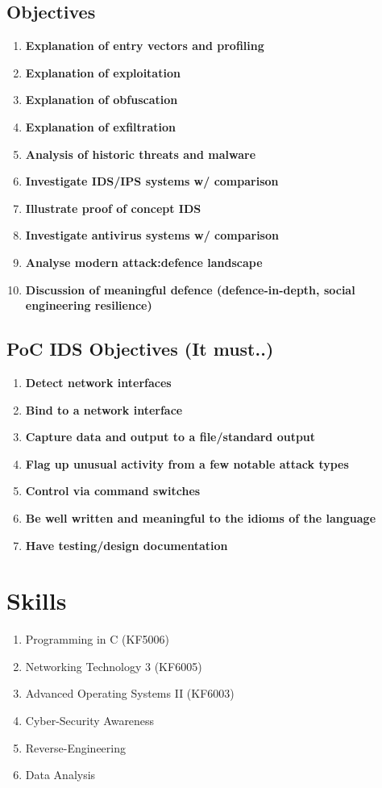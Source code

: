 \subsection{Objectives}
\begin{enumerate}
	\item \textbf{Explanation of entry vectors and profiling}
	\item \textbf{Explanation of exploitation}
	\item \textbf{Explanation of obfuscation}
	\item \textbf{Explanation of exfiltration}
	\item \textbf{Analysis of historic threats and malware}
	\item \textbf{Investigate IDS/IPS systems w/ comparison}
	\item \textbf{Illustrate proof of concept IDS}
	\item \textbf{Investigate antivirus systems w/ comparison}
	\item \textbf{Analyse modern attack:defence landscape}
	\item \textbf{Discussion of meaningful defence (defence-in-depth, social engineering resilience)}
\end{enumerate}

\subsection{PoC IDS Objectives (It must..)}
\begin{enumerate}
	\item \textbf{Detect network interfaces}
	\item \textbf{Bind to a network interface}
	\item \textbf{Capture data and output to a file/standard output}
	\item \textbf{Flag up unusual activity from a few notable attack types}
	\item \textbf{Control via command switches}
	\item \textbf{Be well written and meaningful to the idioms of the language}
	\item \textbf{Have testing/design documentation}
	
\end{enumerate}

\section{Skills}
\begin{enumerate}
	\item Programming in C (KF5006)
	\item Networking Technology 3 (KF6005)
	\item Advanced Operating Systems II (KF6003)
	\item Cyber-Security Awareness
	\item Reverse-Engineering
	\item Data Analysis
\end{enumerate}

